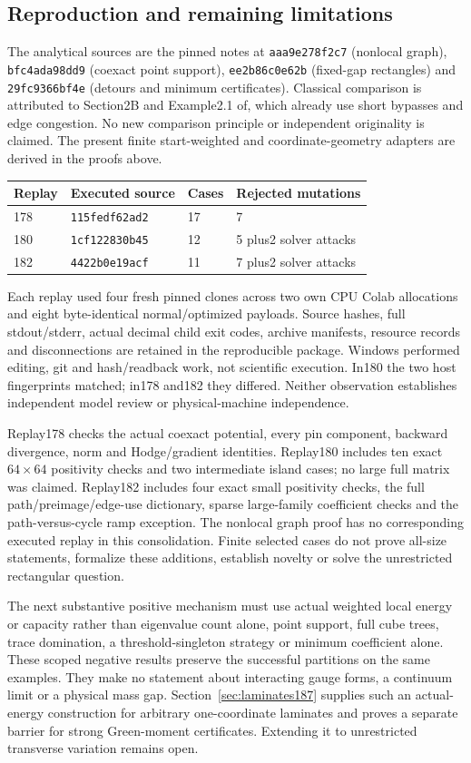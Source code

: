 \subsection{Reproduction and remaining limitations}
The analytical sources are the pinned notes at
\texttt{aaa9e278f2c7} (nonlocal graph), \texttt{bfc4ada98dd9} (coexact
point support), \texttt{ee2b86c0e62b} (fixed-gap rectangles) and
\texttt{29fc9366bf4e} (detours and minimum certificates).
Classical comparison is attributed to Section2B and Example2.1
of\cite{geo:comparison}, which already use short bypasses and edge
congestion. No new comparison principle or independent originality is
claimed. The present finite start-weighted and coordinate-geometry
adapters are derived in the proofs above.

\begin{center}\small
\begin{tabular}{llll}
\toprule
Replay & Executed source & Cases & Rejected mutations\\
\midrule
178 & \texttt{115fedf62ad2} & 17 & 7\\
180 & \texttt{1cf122830b45} & 12 & 5 plus2 solver attacks\\
182 & \texttt{4422b0e19acf} & 11 & 7 plus2 solver attacks\\
\bottomrule
\end{tabular}
\end{center}
Each replay used four fresh pinned clones across two own CPU Colab
allocations and eight byte-identical normal/optimized payloads. Source
hashes, full stdout/stderr, actual decimal child exit codes, archive
manifests, resource records and disconnections are retained in the
reproducible package. Windows performed editing, git and hash/readback
work, not scientific execution. In180 the two host fingerprints matched;
in178 and182 they differed. Neither observation establishes independent
model review or physical-machine independence.

Replay178 checks the actual coexact potential, every pin component,
backward divergence, norm and Hodge/gradient identities. Replay180
includes ten exact $64\times64$ positivity checks and two intermediate
island cases; no large full matrix was claimed. Replay182 includes four
exact small positivity checks, the full path/preimage/edge-use dictionary,
sparse large-family coefficient checks and the path-versus-cycle ramp
exception. The nonlocal graph proof has no corresponding executed replay
in this consolidation. Finite selected cases do not prove all-size
statements, formalize these additions, establish novelty or solve the
unrestricted rectangular question.

The next substantive positive mechanism must use actual weighted local
energy or capacity rather than eigenvalue count alone, point support,
full cube trees, trace domination, a threshold-singleton strategy or
minimum coefficient alone. These scoped negative results preserve the
successful partitions on the same examples. They make no statement about
interacting gauge forms, a continuum limit or a physical mass gap.
Section~\ref{sec:laminates187} supplies such an actual-energy construction
for arbitrary one-coordinate laminates and proves a separate barrier for
strong Green-moment certificates. Extending it to unrestricted transverse
variation remains open.
